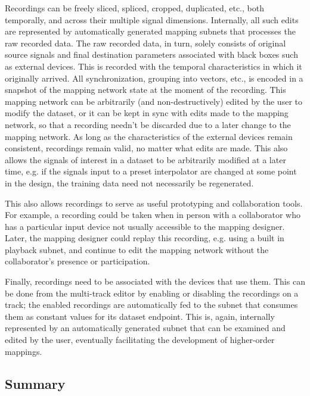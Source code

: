 \documentclass[main.tex]{subfiles}
\begin{document}
Recordings can be freely sliced, spliced, cropped, duplicated, etc., both
temporally, and across their multiple signal dimensions. Internally, all such
edits are represented by automatically generated mapping subnets that processes
the raw recorded data. The raw recorded data, in turn, solely consists of
original source signals and final destination parameters associated with black
boxes such as external devices. This is recorded with the temporal
characteristics in which it originally arrived. All synchronization, grouping
into vectors, etc., is encoded in a snapshot of the mapping network state at
the moment of the recording. This mapping network can be arbitrarily (and
non-destructively) edited by the user to modify the dataset, or it can be kept
in sync with edits made to the mapping network, so that a recording needn't be
discarded due to a later change to the mapping network. As long as the
characteristics of the external devices remain consistent, recordings remain
valid, no matter what edits are made. This also allows the signals of interest
in a dataset to be arbitrarily modified at a later time, e.g. if the signals
input to a preset interpolator are changed at some point in the design, the
training data need not necessarily be regenerated.

This also allows recordings to serve as useful prototyping and collaboration
tools. For example, a recording could be taken when in person with a
collaborator who has a particular input device not usually accessible to the
mapping designer. Later, the mapping designer could replay this recording, e.g.
using a built in playback subnet, and continue to edit the mapping network
without the collaborator's presence or participation.

Finally, recordings need to be associated with the devices that use them. This
can be done from the multi-track editor by enabling or disabling the recordings
on a track; the enabled recordings are automatically fed to the subnet that
consumes them as constant values for its dataset endpoint. This is, again,
internally represented by an automatically generated subnet that can be
examined and edited by the user, eventually facilitating the development of
higher-order mappings.

\subsection{Summary}
\end{document}
